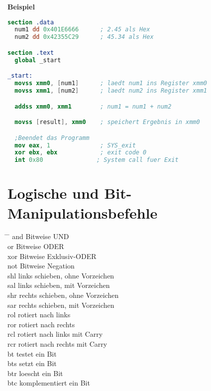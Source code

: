 \documentclass[a4paper,12pt,twoside]{article}
\begin{document}
\textbf{Beispiel}
\begin{center}
\begin{minipage}{1.0\textwidth}
  \begin{lstlisting}[language=NASM]
section .data
  num1 dd 0x401E6666      ; 2.45 als Hex
  num2 dd 0x42355C29      ; 45.34 als Hex

section .text
  global _start

_start:
  movss xmm0, [num1]      ; laedt num1 ins Register xmm0
  movss xmm1, [num2]      ; laedt num2 ins Register xmm1

  addss xmm0, xmm1        ; num1 = num1 + num2

  movss [result], xmm0    ; speichert Ergebnis in xmm0 

  ;Beendet das Programm 
  mov eax, 1              ; SYS_exit 
  xor ebx, ebx            ; exit code 0 
  int 0x80               ; System call fuer Exit
  \end{lstlisting}
\end{minipage}
\end{center}
\section{Logische und Bit-Manipulationsbefehle}
\begin{tabbing}
  \hspace{2mm} \= \hspace{50mm} \= \kill 
  \> and \> Bitweise UND \\ 
  \> or \> Bitweise ODER \\ 
  \> xor \> Bitweise Exklusiv-ODER \\ 
  \> not \> Bitweise Negation \\ 
  \> shl \> links schieben, ohne Vorzeichen  \\ 
  \> sal \> links schieben, mit Vorzeichen \\
  \> shr \> rechts schieben, ohne Vorzeichen \\ 
  \> sar \> rechts schieben, mit Vorzeichen \\
  \> rol \> rotiert nach links \\ 
  \> ror \> rotiert nach rechts \\ 
  \> rcl \> rotiert nach links mit Carry \\ 
  \> rcr \> rotiert nach rechts mit Carry \\ 
  \> bt \> testet ein Bit \\ 
  \> bts \> setzt ein Bit \\ 
  \> btr \> loescht ein Bit \\ 
  \> btc \> komplementiert ein Bit \\ 
\end{tabbing}
\end{document}
